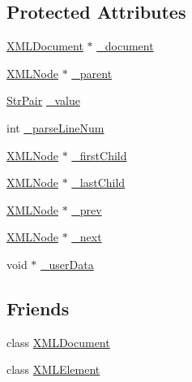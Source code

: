 \subsection*{Protected Attributes}
\begin{DoxyCompactItemize}
\item 
\mbox{\hyperlink{classtinyxml2_1_1_x_m_l_document}{X\+M\+L\+Document}} $\ast$ \mbox{\hyperlink{classtinyxml2_1_1_x_m_l_node_a8d2d2be0bb6797625551eb0e91f0ff62}{\+\_\+document}}
\item 
\mbox{\hyperlink{classtinyxml2_1_1_x_m_l_node}{X\+M\+L\+Node}} $\ast$ \mbox{\hyperlink{classtinyxml2_1_1_x_m_l_node_a176dd1c4965c21c366de192164aa2c13}{\+\_\+parent}}
\item 
\mbox{\hyperlink{classtinyxml2_1_1_str_pair}{Str\+Pair}} \mbox{\hyperlink{classtinyxml2_1_1_x_m_l_node_a3ea9884098b8379de2bb5ab3fc85c0fc}{\+\_\+value}}
\item 
int \mbox{\hyperlink{classtinyxml2_1_1_x_m_l_node_ab336ed023e15be202ff3b410be01b804}{\+\_\+parse\+Line\+Num}}
\item 
\mbox{\hyperlink{classtinyxml2_1_1_x_m_l_node}{X\+M\+L\+Node}} $\ast$ \mbox{\hyperlink{classtinyxml2_1_1_x_m_l_node_aa20c91e4213dc930c5bdf420322ca342}{\+\_\+first\+Child}}
\item 
\mbox{\hyperlink{classtinyxml2_1_1_x_m_l_node}{X\+M\+L\+Node}} $\ast$ \mbox{\hyperlink{classtinyxml2_1_1_x_m_l_node_a099b6560ae44ab9edb8453aaf1a3747b}{\+\_\+last\+Child}}
\item 
\mbox{\hyperlink{classtinyxml2_1_1_x_m_l_node}{X\+M\+L\+Node}} $\ast$ \mbox{\hyperlink{classtinyxml2_1_1_x_m_l_node_a9739eb0fb9a1188266052055e7a6bf6b}{\+\_\+prev}}
\item 
\mbox{\hyperlink{classtinyxml2_1_1_x_m_l_node}{X\+M\+L\+Node}} $\ast$ \mbox{\hyperlink{classtinyxml2_1_1_x_m_l_node_a27e985496b37dd00eb5b9cf59b9e3fb1}{\+\_\+next}}
\item 
void $\ast$ \mbox{\hyperlink{classtinyxml2_1_1_x_m_l_node_ac2d5cc463a6c95ec5907d57a119c56da}{\+\_\+user\+Data}}
\end{DoxyCompactItemize}
\subsection*{Friends}
\begin{DoxyCompactItemize}
\item 
class \mbox{\hyperlink{classtinyxml2_1_1_x_m_l_node_a4eee3bda60c60a30e4e8cd4ea91c4c6e}{X\+M\+L\+Document}}
\item 
class \mbox{\hyperlink{classtinyxml2_1_1_x_m_l_node_ac2fba9b6e452829dd892f7392c24e0eb}{X\+M\+L\+Element}}
\end{DoxyCompactItemize}


